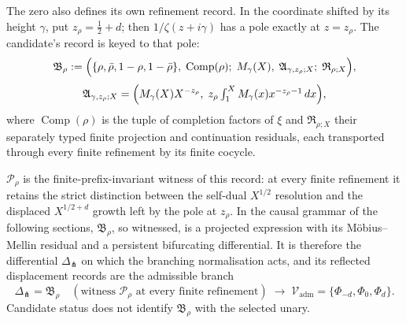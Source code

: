 \documentclass[11pt]{article}
\newcommand{\DeltaFork}{\Delta_{\pitchfork}}
\begin{document}
The zero also defines its own refinement record. In the coordinate shifted by its height \(\gamma\), put \(z_\rho=\frac12+d\); then \(1/\zeta(z+i\gamma)\) has a pole exactly at \(z=z_\rho\). The candidate's record is keyed to that pole:
\[
\mathfrak B_\rho
:=
\Bigl(
\{\rho,\bar\rho,1-\rho,1-\bar\rho\},\;
\operatorname{Comp}(\rho);\;
M_\gamma(X),\;
\mathfrak A_{\gamma,z_\rho;X};\;
\mathfrak R_{\rho;X}
\Bigr),
\]
\[
\mathfrak A_{\gamma,z_\rho;X}
=
\Bigl(M_\gamma(X)X^{-z_\rho},\;
z_\rho\textstyle\int_1^X M_\gamma(x)x^{-z_\rho-1}\,dx\Bigr),
\]
where \(\operatorname{Comp}(\rho)\) is the tuple of completion factors of \(\xi\) and \(\mathfrak R_{\rho;X}\) their separately typed finite projection and continuation residuals, each transported through every finite refinement by its finite cocycle.

\(\mathcal P_\rho\) is the finite-prefix-invariant witness of this record: at every finite refinement it retains the strict distinction between the self-dual \(X^{1/2}\) resolution and the displaced \(X^{1/2+d}\) growth left by the pole at \(z_\rho\). In the causal grammar of the following sections, \(\mathfrak B_\rho\), so witnessed, is a projected expression with its M\"obius--Mellin residual and a persistent bifurcating differential. It is therefore the differential \(\DeltaFork\) on which the branching normalisation acts, and its reflected displacement records are the admissible branch
\[
\DeltaFork=\mathfrak B_\rho
\quad(\text{witness }\mathcal P_\rho\text{ at every finite refinement})
\;\longrightarrow\;
\mathcal V_{\mathrm{adm}}
=
\{\Phi_{-d},\Phi_0,\Phi_d\}.
\]
Candidate status does not identify \(\mathfrak B_\rho\) with the selected unary.

\medskip
\noindent
{}
\medskip
\end{document}
